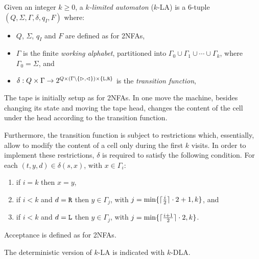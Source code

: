 \begin{defn}
	Given an integer $k\ge0$, a \emph{$k$-limited automaton} ($k$-LA) is a 6-tuple $(Q,\Sigma,\Gamma,\delta,q_I,F)$ where:
	\begin{itemize}
		\item $Q$, $\Sigma$, $q_I$ and $F$ are defined as for 2NFAs,
		\item $\Gamma$ is the finite \emph{working alphabet}, partitioned into $\Gamma_0\cup\Gamma_1\cup\cdots\cup\Gamma_k$, where $\Gamma_0=\Sigma$, and
		\item $\delta:Q\times\Gamma\to2^{Q\times(\Gamma\setminus\{\rhd,\lhd\})\times\{\mathtt L,\mathtt R\}}$ is the \emph{transition function},
	\end{itemize}
	The tape is initially setup as for 2NFAs.
	In one move the machine, besides changing its state and moving the tape head, changes the content of the cell under the head according to the transition function.

	Furthermore, the transition function is subject to restrictions which, essentially, allow to modify the content of a cell only during the first $k$ visits.
	In order to implement these restrictions, $\delta$ is required to satisfy the following condition. For each $(t,y,d)\in\delta(s,x)$, with $x\in\Gamma_i$:
	\begin{enumerate}[(1)]
		\item if $i=k$ then $x=y$,
		\item if $i<k$ and $d=\mathtt R$ then $y\in\Gamma_j$, with $j=\min\{\lceil \frac{i}{2} \rceil\cdot 2+1,k\}$, and
		\item if $i<k$ and $d=\mathtt L$ then $y\in\Gamma_j$, with $j=\min\{\lceil \frac{i+1}{2} \rceil\cdot 2,k\}$.
	\end{enumerate}

	\noindent Acceptance is defined as for 2NFAs.

	\noindent The deterministic version of $k$-LA is indicated with $k$-DLA.
\end{defn}
